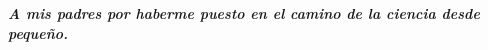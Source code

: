 \vspace*{1.5in}
\begin{flushright}
		\begin{minipage}[b]{5in}
				\Large\bfseries\emph{A mis padres por haberme puesto en el camino de la ciencia desde peque\~no.}
		\end{minipage}
\end{flushright}


